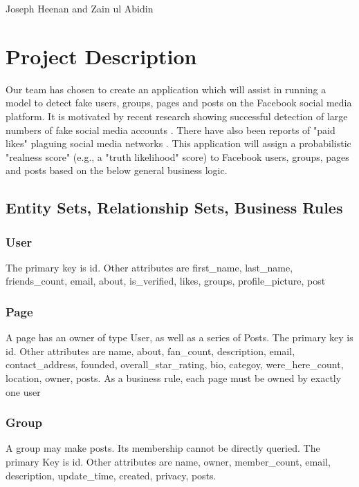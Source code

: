 \documentclass{article}
\begin{document}
\begin{center}
\begin{LARGE}{Joseph Heenan and Zain ul Abidin} \end{LARGE}
\end{center}

\section{Project Description}

Our team has chosen to create an application which will assist in running a model to detect fake users, groups, pages and posts on the Facebook social media platform. It is motivated by recent research showing successful detection of large numbers of fake social media accounts \cite{2017arXiv170102405E}. There have also been reports of "paid likes"  plaguing social media networks \cite{TheBotBubble}. This application will assign a probabilistic "realness score" (e.g., a "truth likelihood" score) to Facebook users, groups, pages and posts based on the below general business logic.

\subsection{Entity Sets, Relationship Sets, Business Rules}

\subsubsection{User}

The primary key is id. Other attributes are first_name, last_name, friends_count, email, about, is_verified, likes, groups, profile_picture, post

\subsubsection{Page}
A page has an owner of type User, as well as a series of Posts. The primary key is id. Other attributes are name, about, fan_count, description, email, contact_address, founded, overall_star_rating, bio, categoy, were_here_count, location, owner, posts. As a business rule, each page must be owned by exactly one user

\subsubsection{Group}
A group may make posts. Its membership cannot be directly queried. The primary Key is id. Other attributes are name, owner, member_count, email, description, update_time, created, privacy, posts.
\end{document}
